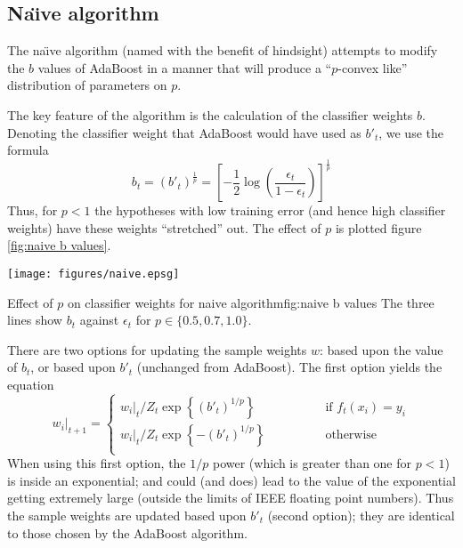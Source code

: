 \subsection{Na\"{\i}ve algorithm}

The na\"{\i}ve algorithm (named with the benefit of hindsight) attempts to
modify the $b$ values of AdaBoost in a manner that will produce a
``$p$-convex like'' distribution of parameters on $p$.

The key feature of the algorithm is the calculation of the classifier
weights $b$.  Denoting the classifier weight that AdaBoost would have
used as $b'_t$, we use the formula
%
\begin{equation}
b_t = (b'_t)^{\frac{1}{p}} = \left[ - \frac{1}{2} \log \left
( \frac{\epsilon_t}{1 - \epsilon_t} \right) \right]^\frac{1}{p}
\end{equation}
%
Thus, for $p < 1$ the hypotheses with low training error (and hence
high classifier weights) have these weights ``stretched'' out.  The
effect of $p$ is plotted figure \ref{fig:naive b values}.

\begin{linefigure}
\begin{center}
\texttt{[image: figures/naive.epsg]}
\end{center}
\begin{capt}{Effect of $p$ on classifier weights for naive algorithm}{fig:naive b values}
The three lines show $b_t$ against $\epsilon_t$ for $p \in \{ 0.5,
0.7, 1.0 \}$.
\end{capt}
\end{linefigure}

There are two options for updating the sample weights $w$: based upon
the value of $b_t$, or based upon $b'_t$ (unchanged from AdaBoost).
The first option yields the equation
%
\begin{equation}
w_i|_{t+1} = \left\{
\begin{array}{cl}
	w_i|_t / Z_t \exp \left\{ (b'_t)^{1/p} \right\} & \qquad \qquad \mbox{if
	$f_t(x_i) = y_i$} \\
	w_i|_t / Z_t \exp \left\{ -(b'_t)^{1/p} \right\} 	& \qquad \qquad
	\mbox{otherwise} \\
\end{array} \right.
\end{equation}
%
When using this first option, the $1/p$ power (which is
greater than one for $p < 1$) is inside an exponential; and could
(and does) lead to the value of the exponential getting extremely
large (outside the limits of IEEE floating point numbers).  Thus the
sample weights are updated based upon $b'_t$ (second option); they are
identical to those chosen by the AdaBoost algorithm.

